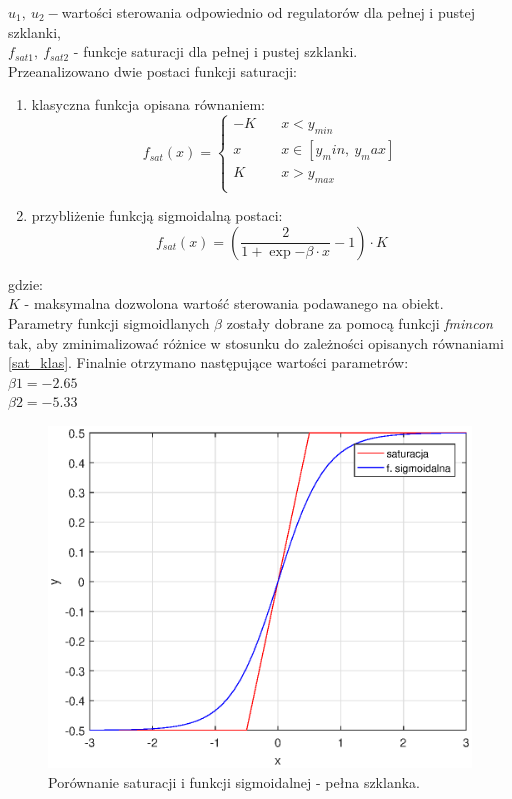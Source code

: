 $u_1, \ u_2 - $wartości sterowania odpowiednio od regulatorów dla pełnej i pustej szklanki,\\
$f_{sat1}, \ f_{sat2}$ - funkcje saturacji dla pełnej i pustej szklanki.
 \\
\newpage
 Przeanalizowano dwie postaci funkcji saturacji: 
 \begin{enumerate}
 	\item klasyczna funkcja opisana równaniem:
 	\begin{equation}\label{sat_klas}
 	f_{sat}(x) = 
 	\begin{cases}
 	-K       & \quad x < y_{min}\\
 	x  & \quad x \in [y_min, \ y_max]\\
 	K       & \quad x > y_{max}\\
 	\end{cases}
 	\end{equation}
 	\item przybliżenie funkcją sigmoidalną postaci:
 	\begin{equation}\label{key}
 	f_{sat}(x) = (\dfrac{2}{1+\exp{-\beta \cdot x}} - 1) \cdot K
 	\end{equation}
 \end{enumerate}
gdzie:\\
$K$ - maksymalna dozwolona wartość sterowania podawanego na obiekt.\\
Parametry funkcji sigmoidlanych $\beta$ zostały dobrane za pomocą funkcji \textit{fmincon} tak, aby zminimalizować różnice w stosunku do zależności opisanych równaniami \ref{sat_klas}. Finalnie otrzymano następujące wartości parametrów:\\
$\beta1 = -2.65$\\
$\beta2 = -5.33$\\

\begin{figure}[h!]
	\centering
	\includegraphics[scale = 0.8]{fig/por_sat_1.eps}
	\caption		
	{Porównanie saturacji i funkcji sigmoidalnej - pełna szklanka.}
	\label{por_sat1}
\end{figure} 

